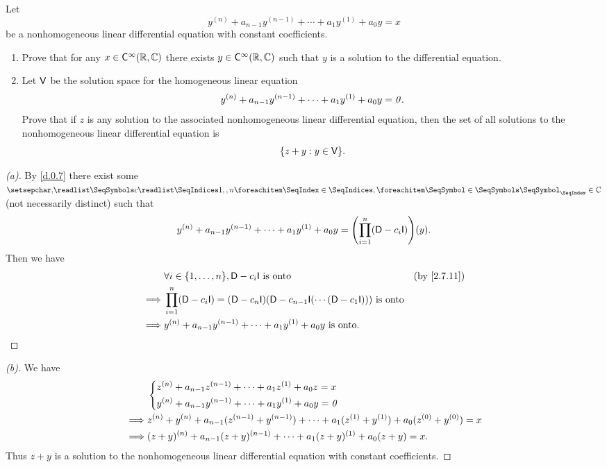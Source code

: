 \begin{ex}\label{ex:2.7.13}
  Let
  \[
    y^{(n)} + a_{n - 1} y^{(n - 1)} + \cdots + a_1 y^{(1)} + a_0 y = x
  \]
  be a nonhomogeneous linear differential equation with constant coefficients.
  \begin{enumerate}
    \item Prove that for any \(x \in \cfs[\infty](\R, \C)\) there exists \(y \in \cfs[\infty](\R, \C)\) such that \(y\) is a solution to the differential equation.
    \item Let \(\mathsf{V}\) be the solution space for the homogeneous linear equation
          \[
            y^{(n)} + a_{n - 1} y^{(n - 1)} + \cdots + a_1 y^{(1)} + a_0 y = \mathit{0}.
          \]
          Prove that if \(z\) is any solution to the associated nonhomogeneous linear differential equation, then the set of all solutions to the nonhomogeneous linear differential equation is
          \[
            \set{z + y : y \in \V}.
          \]
  \end{enumerate}
\end{ex}

\begin{proof}[(a)]
  By \cref{d.0.7} there exist some \(\seq{c}{1,,n} \in \C\) (not necessarily distinct) such that
  \[
    y^{(n)} + a_{n - 1} y^{(n - 1)} + \cdots + a_1 y^{(1)} + a_0 y = \pa{\prod_{i = 1}^n (\Dop - c_i \IT)}(y).
  \]
  Then we have
  \begin{align*}
             & \forall i \in \set{1, \dots, n}, \Dop - c_i \IT \text{ is onto}                                                     &  & \text{(by \cref{2.7.11})} \\
    \implies & \prod_{i = 1}^n (\Dop - c_i \IT) = (\Dop - c_n \IT)(\Dop - c_{n - 1} \IT( \cdots (\Dop - c_1 \IT))) \text{ is onto}                                \\
    \implies & y^{(n)} + a_{n - 1} y^{(n - 1)} + \cdots + a_1 y^{(1)} + a_0 y \text{ is onto}.
  \end{align*}
\end{proof}

\begin{proof}[(b)]
  We have
  \begin{align*}
             & \begin{dcases}
                 z^{(n)} + a_{n - 1} z^{(n - 1)} + \cdots + a_1 z^{(1)} + a_0 z = x \\
                 y^{(n)} + a_{n - 1} y^{(n - 1)} + \cdots + a_1 y^{(1)} + a_0 y = \mathit{0}
               \end{dcases}                                                        \\
    \implies & z^{(n)} + y^{(n)} + a_{n - 1} (z^{(n - 1)} + y^{(n - 1)}) + \cdots + a_1 (z^{(1)} + y^{(1)}) + a_0 (z^{(0)} + y^{(0)}) = x \\
    \implies & (z + y)^{(n)} + a_{n - 1} (z + y)^{(n - 1)} + \cdots + a_1 (z + y)^{(1)} + a_0 (z + y) = x.
  \end{align*}
  Thus \(z + y\) is a solution to the nonhomogeneous linear differential equation with constant coefficients.
\end{proof}

